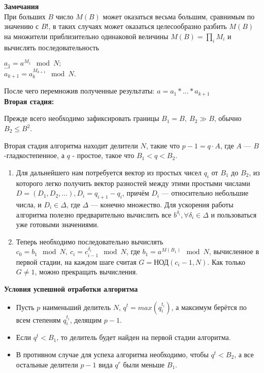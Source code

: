 \documentclass[12pt,a4paper]{scrartcl}
\begin{document}
\textbf{Замечания}\\

При больших $B$ число $M(B)$ может оказаться весьма большим, сравнимым по значению с $B!$, в таких случаях может оказаться целесообразно разбить $M(B)$ на множители приблизительно одинаковой величины $M(B)=\prod _{i}M_{i}$ и вычислять последовательность

\begin{center}
	$a_{1}=a^{M_{1}}\mod N;$\\
	$...$\\
	$a_{k+1}=a_{k}^{M_{k+1}}\mod N$.\\
\end{center}

После чего перемножив полученные результаты: $a=a_{1}*...*a_{k+1}$\\

\textbf{Вторая стадия:}

Прежде всего необходимо зафиксировать границы $\displaystyle B_{1}=B,\ B_{2}\gg B$, обычно $B_{2}\leq B^{2}$.

Вторая стадия алгоритма находит делители $N$, такие что $p-1=q\cdot A$, где $A$ — $B$-гладкостепенное, а $q$ - простое, такое что $B_{1}<q<B_{2}$.

\begin{enumerate}
	\item Для дальнейшего нам потребуется вектор из простых чисел $q_{i}$ от $B_1$ до $B_{2}$, из которого легко получить вектор разностей между этими простыми числами $D=(D_{1},D_{2},...),D_{i}=q_{i+1}-q_{i}$, причём $D_{i}$ — относительно небольшие числа, и $D_{i}\in \Delta$, где $\Delta$ — конечно множество. Для ускорения работы алгоритма полезно предварительно вычислить все $b^{\delta _{i}},\forall \delta _{i}\in \Delta$ и пользоваться уже готовыми значениями.
	\item Теперь необходимо последовательно вычислять $c_{0}=b_{1}\mod N,\ c_{i}=c_{i-1}^{\delta _{i}}\mod N$, где $b_{1}=a^{M(B_{1})}\mod N$, вычисленное в первой стадии, на каждом шаге считая $G=\text{НОД}(c_{i}-1,N)$. Как только $G\neq 1$, можно прекращать вычисления.\\
\end{enumerate}


\textbf{Условия успешной отработки алгоритма}\\

\begin{itemize}
	\item Пусть $p$ наименьший делитель $N$, $q^{t}=max(q_{i}^{t_{i}})$, а максимум берётся по всем степеням $q_{i}^{t_{i}}$, делящим $p-1$.
	\item Если $q^{t}<B_{1}$, то делитель будет найден на первой стадии алгоритма.
	\item В противном случае для успеха алгоритма необходимо, чтобы $q^{t}<B_{2}$, а все остальные делители $p-1$ вида $q^{r}$ были меньше $B_1$.\\
\end{itemize}
\end{document}
